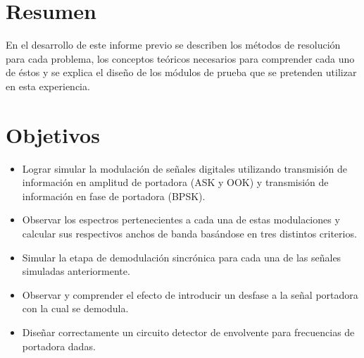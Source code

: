 \documentclass[letterpaper, titlepage]{article}
\begin{document}
\maketitle
\newpage
\section{Resumen}
	En el desarrollo de este informe previo se describen los métodos de resolución para cada problema, los conceptos teóricos necesarios para comprender cada uno de éstos y se explica el diseño de los módulos de prueba que se pretenden utilizar en esta experiencia.
\section{Objetivos}
	\begin{itemize}
		\item Lograr simular la modulación de señales digitales utilizando transmisión de información en amplitud de portadora (ASK y OOK) y transmisión de información en fase de portadora (BPSK).
		\item Observar los espectros pertenecientes a cada una de estas modulaciones y calcular sus respectivos anchos de banda basándose en tres distintos criterios.
		\item Simular la etapa de demodulación sincrónica para cada una de las señales simuladas anteriormente.
		\item Observar y comprender el efecto de introducir un desfase a la señal portadora con la cual se demodula.
		\item Diseñar correctamente un circuito detector de envolvente para frecuencias de portadora dadas.
	\end{itemize}
\newpage
\end{document}
